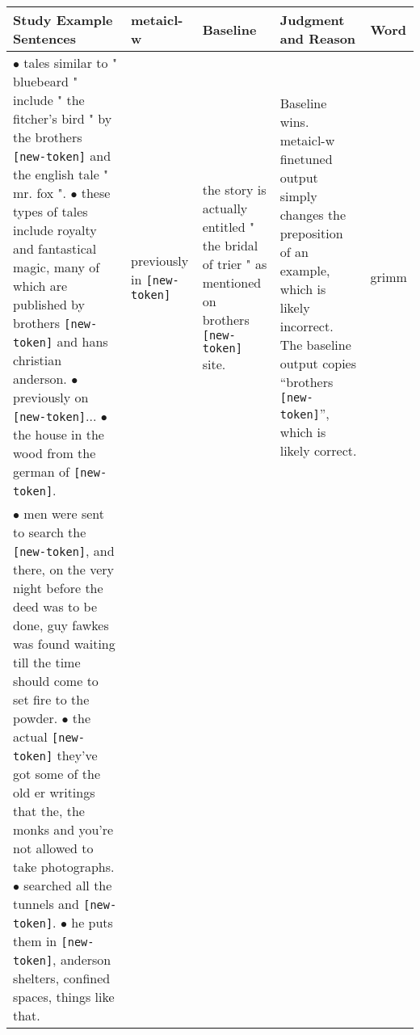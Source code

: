 \documentclass{article}
\begin{document}
\begin{table*}[t]
\small
\begin{center}
\begin{tabular}{p{5.3cm}p{2.3cm}p{2.3cm}p{3cm}p{0.8cm}}
\toprule
\bf Study Example Sentences & \bf \ac{metaicl-w} & \bf Baseline & \bf Judgment and Reason & \bf Word
\\
\midrule
$\bullet$ tales similar to " bluebeard " include " the fitcher's bird " by the brothers \texttt{[new-token]} and the english tale " mr. fox ".
$\bullet$ these types of tales include royalty and fantastical magic, many of which are published by brothers \texttt{[new-token]} and hans christian anderson.
$\bullet$ previously on \texttt{[new-token]}...
$\bullet$ the house in the wood from the german of \texttt{[new-token]}.
& previously in \texttt{[new-token]}
& the story is actually entitled " the bridal of trier " as mentioned on brothers \texttt{[new-token]} site.
& Baseline wins. \ac{metaicl-w} finetuned output simply changes the preposition of an example, which is likely incorrect. The baseline output copies ``brothers \texttt{[new-token]}'', which is likely correct.
& grimm
\\
\midrule
$\bullet$ men were sent to search the \texttt{[new-token]}, and there, on the very night before the deed was to be done, guy fawkes was found waiting till the time should come to set fire to the powder.
$\bullet$ the actual \texttt{[new-token]}   they've got some of the old er   writings that the, the monks   and you're not allowed to take photographs.
$\bullet$ searched all the tunnels and \texttt{[new-token]}.
$\bullet$ he puts them in \texttt{[new-token]}, anderson shelters, confined spaces, things like that.

\end{tabular}
\end{center}
\end{table*}
\end{document}
